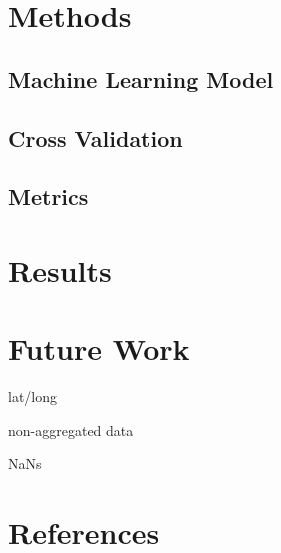 \documentclass[letterpaper]{article}
\begin{document}
\section{Methods}

\subsection{Machine Learning Model}

\subsection{Cross Validation}

\subsection{Metrics}

\section{Results}

\section{Future Work}

lat/long

non-aggregated data

NaNs

\section{References}
\end{document}
